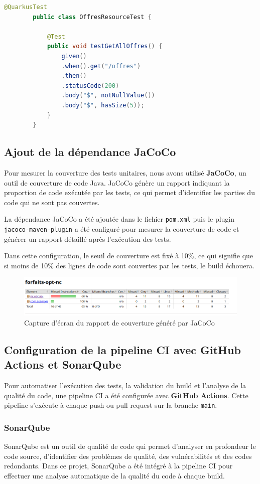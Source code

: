 \documentclass{article}
\begin{document}
	\begin{lstlisting}[language=Java]
		@QuarkusTest
		public class OffresResourceTest {
			
			@Test
			public void testGetAllOffres() {
				given()
				.when().get("/offres")
				.then()
				.statusCode(200)
				.body("$", notNullValue())
				.body("$", hasSize(5));
			}
		}
	\end{lstlisting}
	
	\subsection{Ajout de la dépendance JaCoCo}
	Pour mesurer la couverture des tests unitaires, nous avons utilisé \textbf{JaCoCo}, un outil de couverture de code Java. JaCoCo génère un rapport indiquant la proportion de code exécutée par les tests, ce qui permet d'identifier les parties du code qui ne sont pas couvertes.
	
	La dépendance JaCoCo a été ajoutée dans le fichier \texttt{pom.xml} puis le plugin \texttt{jacoco-maven-plugin} a été configuré pour mesurer la couverture de code et générer un rapport détaillé après l'exécution des tests.
	
	Dans cette configuration, le seuil de couverture est fixé à 10\%, ce qui signifie que si moins de 10\% des lignes de code sont couvertes par les tests, le build échouera.
	
	\begin{figure}[h!]
		\centering
		\includegraphics[width=\textwidth]{asset/jacoco.png}
		\caption{Capture d'écran du rapport de couverture généré par JaCoCo}
		\label{fig:jacoco-report}
	\end{figure}
	
	\subsection{Configuration de la pipeline CI avec GitHub Actions et SonarQube}
	Pour automatiser l'exécution des tests, la validation du build et l'analyse de la qualité du code, une pipeline CI a été configurée avec \textbf{GitHub Actions}. Cette pipeline s'exécute à chaque push ou pull request sur la branche \texttt{main}.
	
	\subsubsection{SonarQube}
	SonarQube est un outil de qualité de code qui permet d'analyser en profondeur le code source, d'identifier des problèmes de qualité, des vulnérabilités et des codes redondants. Dans ce projet, SonarQube a été intégré à la pipeline CI pour effectuer une analyse automatique de la qualité du code à chaque build.
	
\end{document}
